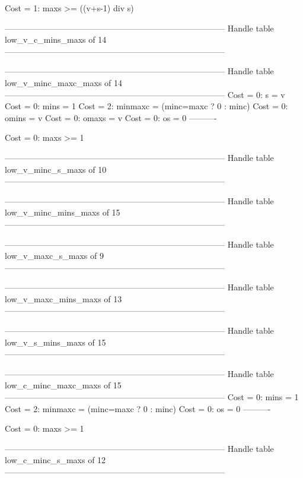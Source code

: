 Cost =  1:  maxs >= ((v+s-1) div s)

--------------------------------------------------------------------------------
Handle table low_v_c_mins_maxs of 14
--------------------------------------------------------------------------------


--------------------------------------------------------------------------------
Handle table low_v_minc_maxc_maxs of 14
--------------------------------------------------------------------------------
Cost =  0:  s       = v
Cost =  0:  mins    = 1
Cost =  2:  minmaxc = (minc=maxc ? 0 : minc)
Cost =  0:  omins   = v
Cost =  0:  omaxs   = v
Cost =  0:  os      = 0
----------

Cost =  0:  maxs >= 1

--------------------------------------------------------------------------------
Handle table low_v_minc_s_maxs of 10
--------------------------------------------------------------------------------


--------------------------------------------------------------------------------
Handle table low_v_minc_mins_maxs of 15
--------------------------------------------------------------------------------


--------------------------------------------------------------------------------
Handle table low_v_maxc_s_maxs of 9
--------------------------------------------------------------------------------


--------------------------------------------------------------------------------
Handle table low_v_maxc_mins_maxs of 13
--------------------------------------------------------------------------------


--------------------------------------------------------------------------------
Handle table low_v_s_mins_maxs of 15
--------------------------------------------------------------------------------


--------------------------------------------------------------------------------
Handle table low_c_minc_maxc_maxs of 15
--------------------------------------------------------------------------------
Cost =  0:  mins    = 1
Cost =  2:  minmaxc = (minc=maxc ? 0 : minc)
Cost =  0:  os      = 0
----------

Cost =  0:  maxs >= 1

--------------------------------------------------------------------------------
Handle table low_c_minc_s_maxs of 12
--------------------------------------------------------------------------------


